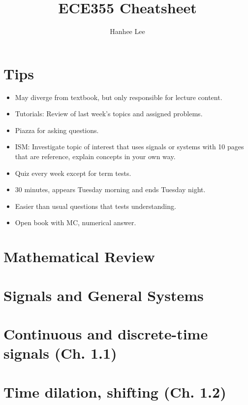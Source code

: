 \documentclass{article}
\title{ECE355 Cheatsheet}
\author{Hanhee Lee}
\begin{document}
\maketitle

\tableofcontents

\listoffigures

\listoftables

\section{Tips}
\begin{intuition}
    \begin{itemize}
        \item May diverge from textbook, but only responsible for lecture content.
        \item Tutorials: Review of last week's topics and assigned problems. 
        \item Piazza for asking questions.
        \item ISM: Investigate topic of interest that uses signals or systems with 10 pages that are reference, explain concepts in your own way.
        \item Quiz every week except for term tests. 
        \item 30 minutes, appears Tuesday morning and ends Tuesday night. 
        \item Easier than usual questions that tests understanding. 
        \item Open book with MC, numerical answer. 
    \end{itemize}
\end{intuition}

\section{Mathematical Review}

\newpage

\section*{Signals and General Systems}
\section{Continuous and discrete-time signals (Ch. 1.1)}

\newpage

\section{Time dilation, shifting (Ch. 1.2)}

\newpage
\end{document}
